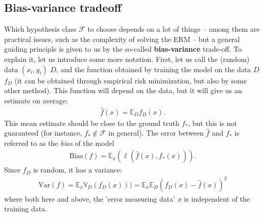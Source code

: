 \documentclass{article}
\newcommand{\calF}{\mathcal{F}}
\begin{document}
\subsection{Bias-variance tradeoff}
Which hypothesis class $\calF$ to choose depends on a lot of things -- among them are practical issues, such as the complexity of solving the ERM -- but a general guiding principle is given to us by the so-called \textbf{bias-variance} trade-off. To explain it, let us introduce some more notation. First, let us call the (random) data $(x_i,y_i)$ $D$, and the function obtained by training the model on the data $D$ $f_D$ (it can be obtained through empirical risk minimization, but also by some other method). This function will depend on the data, but it will give us an estimate on average:
\begin{align*}
    \widehat{f}(x) = \mathbb{E}_D f_D(x).
\end{align*}
This mean estimate should be close to the ground truth $f_*$, but this is not guaranteed (for instance, $f_*\notin \calF$ in general). The error between $\widehat{f}$ and $f_*$ is referred to as the \emph{bias} of the model
\begin{align*}
    \mathrm{Bias}(f) = \mathbb{E}_x(\ell(\widehat{f}(x),f_*(x))).
\end{align*}
Since $f_D$ is random, it has a variance:
\begin{align*}
    \mathrm{Var}(f) = \mathbb{E}_x \mathbb{V}_D(f_D(x))) = \mathbb{E}_x \mathbb{E}_D(f_D(x)-\widehat{f}(x))^2
\end{align*}
where both here and above, the 'error measuring data' $x$ is independent of the training data. 
\end{document}
